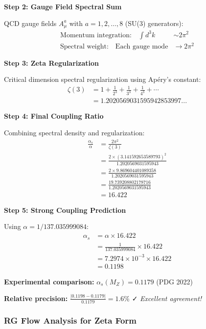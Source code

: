 \textbf{Step 2: Gauge Field Spectral Sum}

QCD gauge fields $A_\mu^a$ with $a = 1, 2, \ldots, 8$ (SU(3) generators):
\begin{align}
\text{Momentum integration:} \quad \int d^3k &\sim 2\pi^2 \tag{3D momentum space}\\
\text{Spectral weight:} \quad \text{Each gauge mode} &\rightarrow 2\pi^2 \tag{Contribution}
\end{align}

\textbf{Step 3: Zeta Regularization}

Critical dimension spectral regularization using Apéry's constant:
\begin{align}
\zeta(3) &= 1 + \frac{1}{2^3} + \frac{1}{3^3} + \frac{1}{4^3} + \cdots \\
&= 1.2020569031595942853997... \tag{Apéry's constant}
\end{align}

\textbf{Step 4: Final Coupling Ratio}

Combining spectral density and regularization:
\begin{align}
\frac{\alpha_s}{\alpha} &= \frac{2\pi^2}{\zeta(3)} \\
&= \frac{2 \times (3.141592653589793)^2}{1.2020569031595943} \\
&= \frac{2 \times 9.869604401089358}{1.2020569031595943} \\
&= \frac{19.739208802178716}{1.2020569031595943} \\
&= 16.422
\end{align}

\textbf{Step 5: Strong Coupling Prediction}

Using $\alpha = 1/137.035999084$:
\begin{align}
\alpha_s &= \alpha \times 16.422 \\
&= \frac{1}{137.035999084} \times 16.422 \\
&= 7.2974 \times 10^{-3} \times 16.422 \\
&= 0.1198
\end{align}

\textbf{Experimental comparison:} $\alpha_s(M_Z) = 0.1179$ (PDG 2022)

\textbf{Relative precision:} $\frac{|0.1198 - 0.1179|}{0.1179} = 1.6\%$ ✓ \textit{Excellent agreement!}

\subsubsection{RG Flow Analysis for Zeta Form}

